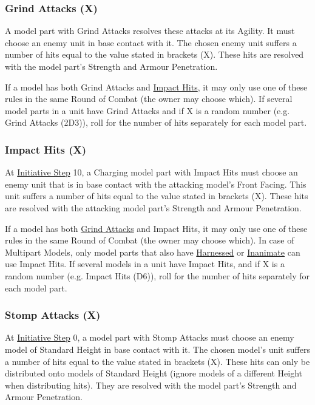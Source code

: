 \subsubsection{Grind Attacks (X)}
\idx[main=y]{\grindattacks{}}\label{grind_attacks}

A model part with Grind Attacks resolves these attacks at its Agility. It must choose an enemy unit in base contact with it. The chosen enemy unit suffers a number of hits equal to the value stated in brackets (X). These hits are resolved with the model part's Strength and Armour Penetration.

If a model has both Grind Attacks and \hyperref[impact_hits]{Impact Hits}, it may only use one of these rules in the same Round of Combat (the owner may choose which). If several model parts in a unit have Grind Attacks and if X is a random number (e.g. Grind Attacks (2D3)), roll for the number of hits separately for each model part.

\subsubsection{Impact Hits (X)}
\idx[main=y]{\impacthits{}}\label{impact_hits}

At \hyperref[initiative_order]{Initiative Step} 10, a Charging model part with Impact Hits must choose an enemy unit that is in base contact with the attacking model's Front Facing. This unit suffers a number of hits equal to the value stated in brackets (X). These hits are resolved with the attacking model part's Strength and Armour Penetration.

If a model has both \hyperref[grind_attacks]{Grind Attacks} and Impact Hits, it may only use one of these rules in the same Round of Combat (the owner may choose which). In case of Multipart Models, only model parts that also have \hyperref[harnessed]{Harnessed} or \hyperref[inanimate]{Inanimate} can use Impact Hits. If several models in a unit have Impact Hits, and if X is a random number (e.g. Impact Hits (D6)), roll for the number of hits separately for each model part.

\subsubsection{Stomp Attacks (X)}
\idx[main=y]{\stompattacks{}}\label{stomp_attacks}

At \hyperref[initiative_order]{Initiative Step} 0, a model part with Stomp Attacks must choose an enemy model of Standard Height in base contact with it. The chosen model's unit suffers a number of hits equal to the value stated in brackets (X). These hits can only be distributed onto models of Standard Height (ignore models of a different Height when distributing hits). They are resolved with the model part's Strength and Armour Penetration.

